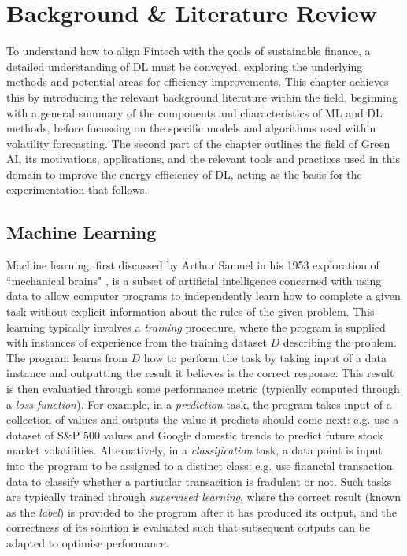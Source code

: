 \documentclass[a4paper, 11pt]{report}
\begin{document}
    \newpage
    \chapter{Background \& Literature Review}
    \label{chapter: literature}

    To understand how to align Fintech with the goals of sustainable finance, a detailed understanding of DL must be conveyed, exploring the underlying methods and potential areas for efficiency improvements. This chapter achieves this by introducing the relevant background literature within the field, beginning with a general summary of the components and characteristics of ML and DL methods, before focussing on the specific models and algorithms used within volatility forecasting. The second part of the chapter outlines the field of Green AI, its motivations, applications, and the relevant tools and practices used in this domain to improve the energy efficiency of DL, acting as the basis for the experimentation that follows.


    \section{Machine Learning}

    Machine learning, first discussed by Arthur Samuel in his 1953 exploration of ``mechanical brains" \citep{samuel-1959}, is a subset of artificial intelligence concerned with using data to allow computer programs to independently learn how to complete a given task without explicit information about the rules of the given problem. This learning typically involves a \emph{training} procedure, where the program is supplied with instances of experience from the training dataset $D$ describing the problem. The program learns from $D$ how to perform the  task by taking input of a data instance and outputting the result it believes is the correct response. This result is then evaluatied through some performance metric (typically computed through a \emph{loss function}). For example, in a \emph{prediction} task, the program takes input of a collection of values and outputs the value it predicts should come next: e.g. \citet{xiong-2015} use a dataset of S\&P 500 values and Google domestic trends to predict future stock market volatilities. Alternatively, in a \emph{classification} task, a data point is input into the program to be assigned to a distinct class: e.g. \citet{sadgali-2019} use financial transaction data to classify whether a partiuclar transacition is fradulent or not. Such tasks are typically trained through \emph{supervised learning}, where the correct result (known as the \emph{label}) is provided to the program after it has produced its output, and the correctness of its solution is evaluated such that subsequent outputs can be adapted to optimise performance.
\end{document}
